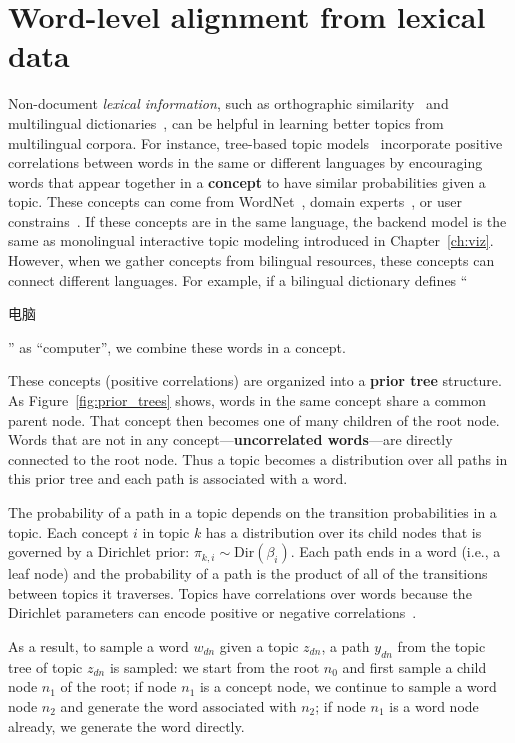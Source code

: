 \section{Word-level alignment from lexical data}

Non-document \emph{lexical information}, such as orthographic
similarity~\citep{boyd-graber-09} and multilingual
dictionaries~\citep{boyd-graber-10}, can be helpful in learning
better topics from multilingual corpora. For instance, tree-based
topic models~\citep[\tlda{}]{boyd-graber-07,andrzejewski-09,hu-14:itm}
incorporate positive correlations between words in the same or
different languages by encouraging words that appear together in a
{\bf concept} to have similar probabilities given a topic. These
concepts can come from WordNet~\citep{boyd-graber-10}, domain
experts~\citep{andrzejewski-09}, or user
constrains~\citep{hu-14:itm}. If these concepts are in the same
language, the backend model is the same as monolingual interactive topic modeling
introduced in Chapter~\ref{ch:viz}. However, when we gather concepts
from bilingual resources, these concepts can connect different
languages. For example, if a bilingual dictionary defines
``\begin{CJK*}{UTF8}{gbsn}电脑\end{CJK*}'' as ``computer'', we combine
  these words in a concept.

These concepts (positive correlations) are organized into a {\bf prior
  tree} structure. As Figure~\ref{fig:prior_trees} shows, words in the
same concept share a common parent node. That concept then becomes
one of many children of the root node.  Words that are not in any
concept---{\bf uncorrelated words}---are directly connected to the
root node. Thus a topic becomes a distribution over all paths in this
prior tree and each path is associated with a word.

The probability of a path in a topic depends on the transition
probabilities in a topic.  Each concept $i$ in topic $k$ has a
distribution over its child nodes that is governed by a Dirichlet prior:
$\pi_{k,i} \sim \text{Dir}(\beta_{i})$.  Each path ends in a word
(i.e., a leaf node) and the probability of a path is the product of
all of the transitions between topics it traverses. Topics have
correlations over words because the Dirichlet parameters can encode
positive or negative correlations~\citep{andrzejewski-09}.

As a result, to sample a word $w_{dn}$ given a topic $z_{dn}$, a path
$y_{dn}$ from the topic tree of topic $z_{dn}$ is sampled: we start
from the root $n_0$ and first sample a child node $n_1$ of the root;
if node $n_1$ is a concept node, we continue to sample a word node
$n_2$ and generate the word associated with $n_2$; if node $n_1$ is a
word node already, we generate the word directly.

